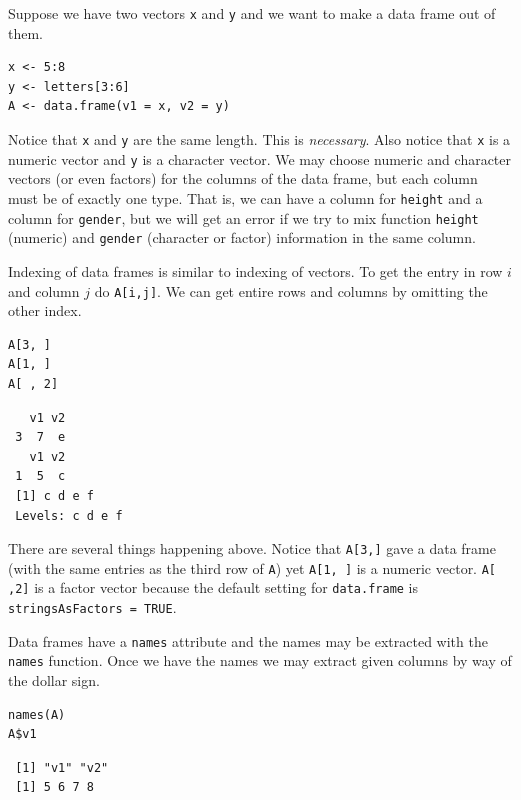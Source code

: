 \documentclass[captions=tableheading]{scrbook}
\begin{document}
\begin{example}
Suppose we have two vectors \texttt{x} and \texttt{y} and we want to make a data frame out of them.


\begin{verbatim}
x <- 5:8
y <- letters[3:6]
A <- data.frame(v1 = x, v2 = y)
\end{verbatim}

\end{example}

Notice that \texttt{x} and \texttt{y} are the same length. This is \emph{necessary}. Also notice that \texttt{x} is a numeric vector and \texttt{y} is a character vector. We may choose numeric and character vectors (or even factors) for the columns of the data frame, but each column must be of exactly one type. That is, we can have a column for \texttt{height} and a column for \texttt{gender}, but we will get an error if we try to mix function \texttt{height} (numeric) and \texttt{gender} (character or factor) information in the same column.

Indexing of data frames is similar to indexing of vectors. To get the entry in row \(i\) and column \(j\) do \texttt{A[i,j]}. We can get entire rows and columns by omitting the other index. 


\begin{verbatim}
A[3, ]
A[1, ]
A[ , 2]
\end{verbatim}

\begin{verbatim}
   v1 v2
 3  7  e
   v1 v2
 1  5  c
 [1] c d e f
 Levels: c d e f
\end{verbatim}

There are several things happening above. Notice that \texttt{A[3,]} gave a data frame (with the same entries as the third row of \texttt{A}) yet \texttt{A[1, ]} is a numeric vector. \texttt{A[ ,2]} is a factor vector because the default setting for \texttt{data.frame} is \texttt{stringsAsFactors = TRUE}.

Data frames have a \texttt{names} attribute and the names may be extracted with the \texttt{names} function. Once we have the names we may extract given columns by way of the dollar sign.


\begin{verbatim}
names(A)
A$v1
\end{verbatim}

\begin{verbatim}
 [1] "v1" "v2"
 [1] 5 6 7 8
\end{verbatim}
\end{document}
